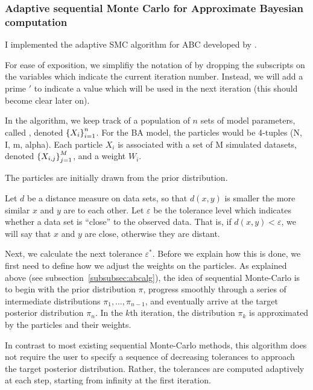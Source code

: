 \subsubsection*{Adaptive sequential Monte Carlo for Approximate Bayesian computation}

I implemented the adaptive \gls{SMC} algorithm for \gls{ABC} developed by
\textcite{del2012adaptive}. 

For ease of exposition, we simplifiy the notation of \textcite{del2012adaptive}
by dropping the subscripts on the variables which indicate the current
iteration number. Instead, we will add a prime $'$ to indicate a value which
will be used in the next iteration (this should become clear later on). 

In the algorithm, we keep track of a population of $n$ sets of model
parameters, called , denoted $\left\lbrace X_i\right\rbrace_{i=1}^{n}$. For the
\gls{BA} model, the particles would be 4-tuples (\gls{N}, \gls{I}, \gls{m},
\gls{alpha}). Each particle $X_i$ is associated with a set of \gls{M} simulated
datasets, denoted $\left\lbrace X_{i,j}\right\rbrace_{j=1}^M$, and a weight $W_i$. 

The particles are initially drawn from the prior distribution.

Let $d$ be a
distance measure on data sets, so that $d(x, y)$ is smaller the more similar
$x$ and $y$ are to each other. Let $\varepsilon$ be the tolerance level which
indicates whether a data set is ``close'' to the observed data. That is, if
$d(x, y) < \varepsilon$, we will say that $x$ and $y$ are close, otherwise they
are distant.


Next, we calculate the next tolerance $\varepsilon^*$. Before we explain how
this is done, we first need to define how we adjust the weights on the
particles. As explained above (see subsection~\ref{subsubsec:abcalg}), the idea
of sequential Monte-Carlo is to begin with the prior distribution $\pi$,
progress smoothly through a series of intermediate distributions $\pi_1,
\ldots, \pi_{n-1}$, and eventually arrive at the target posterior distribution
$\pi_n$. In the $k$th iteration, the distribution $\pi_k$ is approximated by
the particles and their weights. 

In contrast to most existing sequential Monte-Carlo methods, this
algorithm does not require the user to specify a sequence of decreasing
tolerances to approach the target posterior distribution. Rather, the
tolerances are computed adaptively at each step, starting from infinity at the
first iteration. 

